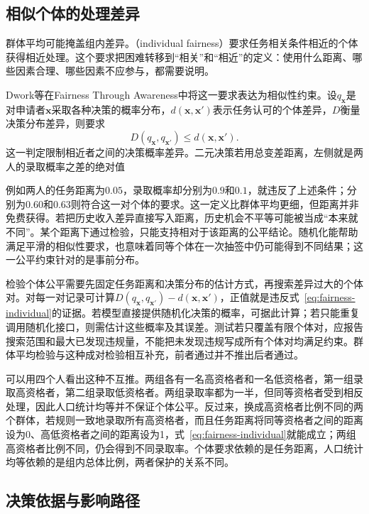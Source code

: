 \subsection{相似个体的处理差异}
\label{sec:fairness-individual-comparison}

群体平均可能掩盖组内差异。（individual fairness）要求任务相关条件相近的个体获得相近处理。这个要求把困难转移到“相关”和“相近”的定义：使用什么距离、哪些因素合理、哪些因素不应参与，都需要说明。

Dwork等在Fairness Through Awareness中将这一要求表达为相似性约束。设$q_{\bm{x}}$是对申请者$\bm{x}$采取各种决策的概率分布，$d(\bm{x},\bm{x}')$表示任务认可的个体差异，$D$衡量决策分布差异，则要求
\begin{equation}
 D(q_{\bm{x}},q_{\bm{x}'})\leq d(\bm{x},\bm{x}').
 \label{eq:fairness-individual}
\end{equation}
这一判定限制相近者之间的决策概率差异。二元决策若用总变差距离，左侧就是两人的录取概率之差的绝对值

例如两人的任务距离为$0.05$，录取概率却分别为$0.9$和$0.1$，就违反了上述条件；分别为$0.60$和$0.63$则符合这一对个体的要求。这一定义比群体平均更细，但距离并非免费获得。若把历史收入差异直接写入距离，历史机会不平等可能被当成“本来就不同”。某个距离下通过检验，只能支持相对于该距离的公平结论。随机化能帮助满足平滑的相似性要求，也意味着同等个体在一次抽签中仍可能得到不同结果；这一公平约束针对的是事前分布。

检验个体公平需要先固定任务距离和决策分布的估计方式，再搜索差异过大的个体对。对每一对记录可计算$D(q_{\bm{x}},q_{\bm{x}'})-d(\bm{x},\bm{x}')$，正值就是违反式~\eqref{eq:fairness-individual}的证据。若模型直接提供随机化决策的概率，可据此计算；若只能重复调用随机化接口，则需估计这些概率及其误差。测试若只覆盖有限个体对，应报告搜索范围和最大已发现违规量，不能把未发现违规写成所有个体对均满足约束。群体平均检验与这种成对检验相互补充，前者通过并不推出后者通过。

可以用四个人看出这种不互推。两组各有一名高资格者和一名低资格者，第一组录取高资格者，第二组录取低资格者。两组录取率都为一半，但同等资格者受到相反处理，因此人口统计均等并不保证个体公平。反过来，换成高资格者比例不同的两个群体，若规则一致地录取所有高资格者，而且任务距离将同等资格者之间的距离设为0、高低资格者之间的距离设为1，式~\eqref{eq:fairness-individual}就能成立；两组高资格者比例不同，仍会得到不同录取率。个体要求依赖的是任务距离，人口统计均等依赖的是组内总体比例，两者保护的关系不同。

\subsection{决策依据与影响路径}
\label{sec:fairness-counterfactual-comparison}

